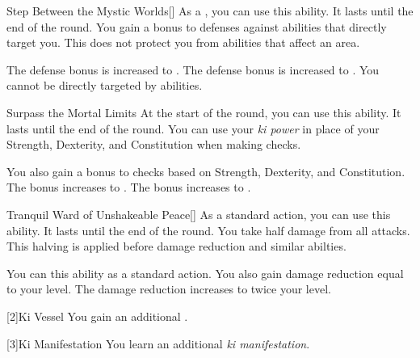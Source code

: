 {            \begin{ability}{Step Between the Mystic Worlds}[]
                As a , you can use this ability.
                It lasts until the end of the round.
                You gain a  bonus to defenses against  abilities that directly target you.
                This does not protect you from abilities that affect an area.

                \rankline
                 The defense bonus is increased to .
                 The defense bonus is increased to .
                 You cannot be directly targeted by  abilities.
            \end{ability}

            \begin{ability}{Surpass the Mortal Limits}
                At the start of the round, you can use this ability.
                It lasts until the end of the round.
                You can use your \textit{ki power} in place of your Strength, Dexterity, and Constitution when making checks.

                \rankline
                 You also gain a  bonus to checks based on Strength, Dexterity, and Constitution.
                 The bonus increases to .
                 The bonus increases to .
            \end{ability}

            \begin{ability}{Tranquil Ward of Unshakeable Peace}[]
                As a standard action, you can use this ability.
                It lasts until the end of the round.
                You take half damage from all attacks.
                This halving is applied before damage reduction and similar abilties.

                \rankline
                 You can  this ability as a standard action.
                 You also gain damage reduction equal to your level.
                 The damage reduction increases to twice your level.
            \end{ability}
        }

        [2]{Ki Vessel} You gain an additional .

        [3]{Ki Manifestation}
        You learn an additional \textit{ki manifestation}.

